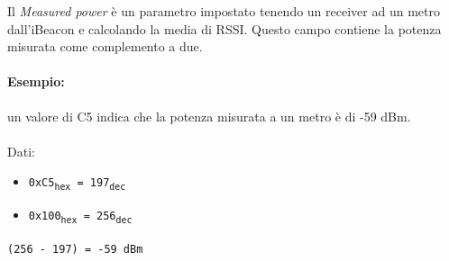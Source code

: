 Il \textit{Measured power} è un parametro impostato tenendo un receiver ad un metro dall'iBeacon e calcolando la media di RSSI. Questo campo contiene la potenza misurata come complemento a due. 

\paragraph{Esempio:} un valore di C5 indica che la potenza misurata a un metro è di -59 dBm.
\\\\Dati:
\begin{itemize}
	\item \texttt{0xC5\textsubscript{hex} = 197\textsubscript{dec}}
	\item \texttt{0x100\textsubscript{hex} = 256\textsubscript{dec}}
\end{itemize}
\begin{center}
	\texttt{(256 - 197) = -59 dBm}
\end{center}
